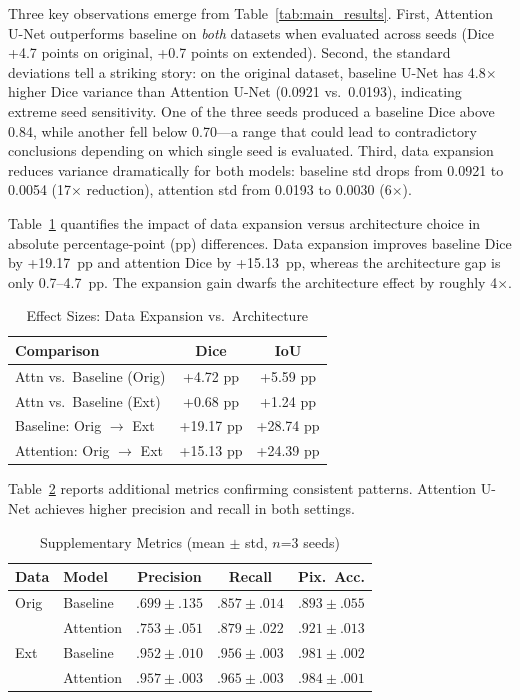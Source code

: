\documentclass[conference]{IEEEtran}
\begin{document}
Three key observations emerge from Table~\ref{tab:main_results}. First, Attention U-Net outperforms baseline on \emph{both} datasets when evaluated across seeds (Dice +4.7 points on original, +0.7 points on extended). Second, the standard deviations tell a striking story: on the original dataset, baseline U-Net has 4.8$\times$ higher Dice variance than Attention U-Net (0.0921 vs.\ 0.0193), indicating extreme seed sensitivity. One of the three seeds produced a baseline Dice above 0.84, while another fell below 0.70---a range that could lead to contradictory conclusions depending on which single seed is evaluated. Third, data expansion reduces variance dramatically for both models: baseline std drops from 0.0921 to 0.0054 (17$\times$ reduction), attention std from 0.0193 to 0.0030 (6$\times$).

Table~\ref{tab:improvement} quantifies the impact of data expansion versus architecture choice in absolute percentage-point (pp) differences. Data expansion improves baseline Dice by +19.17~pp and attention Dice by +15.13~pp, whereas the architecture gap is only 0.7--4.7~pp. The expansion gain dwarfs the architecture effect by roughly 4$\times$.

\begin{table}[t]
\caption{Effect Sizes: Data Expansion vs.\ Architecture}
\label{tab:improvement}
\centering
\begin{tabular}{lcc}
\toprule
\textbf{Comparison} & \textbf{Dice} & \textbf{IoU} \\
\midrule
Attn vs.\ Baseline (Orig) & +4.72 pp & +5.59 pp \\
Attn vs.\ Baseline (Ext) & +0.68 pp & +1.24 pp \\
\midrule
Baseline: Orig $\rightarrow$ Ext & +19.17 pp & +28.74 pp \\
Attention: Orig $\rightarrow$ Ext & +15.13 pp & +24.39 pp \\
\bottomrule
\end{tabular}
\end{table}

Table~\ref{tab:full_metrics} reports additional metrics confirming consistent patterns. Attention U-Net achieves higher precision and recall in both settings.

\begin{table}[t]
\caption{Supplementary Metrics (mean $\pm$ std, $n$=3 seeds)}
\label{tab:full_metrics}
\centering
\small
\begin{tabular}{llccc}
\toprule
\textbf{Data} & \textbf{Model} & \textbf{Precision} & \textbf{Recall} & \textbf{Pix.\ Acc.} \\
\midrule
Orig & Baseline & $.699 \pm .135$ & $.857 \pm .014$ & $.893 \pm .055$ \\
 & Attention & $.753 \pm .051$ & $.879 \pm .022$ & $.921 \pm .013$ \\
\midrule
Ext & Baseline & $.952 \pm .010$ & $.956 \pm .003$ & $.981 \pm .002$ \\
 & Attention & $.957 \pm .003$ & $.965 \pm .003$ & $.984 \pm .001$ \\
\bottomrule
\end{tabular}
\end{table}
\end{document}
